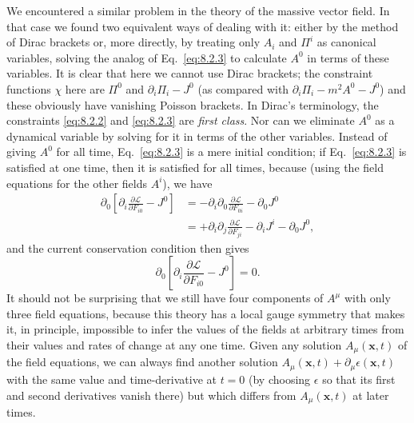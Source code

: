 We encountered a similar problem in the theory of the massive vector
field. In that case we found two equivalent ways of dealing with it:
either by the method of Dirac brackets or, more directly, by treating only
$A_i$ and $\Pi^i$ as canonical variables, solving the analog of Eq.~\eqref{eq:8.2.3} to
calculate $A^0$ in terms of these variables. It is clear that here we cannot
use Dirac brackets; the constraint functions $\chi$ here are $\Pi^0$ and
$\partial_i\Pi_i-J^0$ (as compared with $\partial_i\Pi_i-m^2A^0-J^0$) and these
obviously have vanishing Poisson brackets. In Dirac's terminology, the
constraints \eqref{eq:8.2.2} and \eqref{eq:8.2.3} are \textit{first class}. Nor can we eliminate
$A^0$ as a dynamical variable by solving for it in terms of the other variables.
Instead of giving $A^0$ for all time, Eq.~\eqref{eq:8.2.3} is a mere initial condition;
if Eq.~\eqref{eq:8.2.3} is satisfied at one time, then it is satisfied for all times,
because (using the field equations for the other fields $A^i$), we have
\begin{align*}
  \partial_0\left[\partial_i\frac{\partial\mathcal L}{\partial F_{i0}}-J^0\right]
  &=-\partial_i\partial_0\frac{\partial\mathcal L}{\partial F_{0i}}
  -\partial_0J^0\\
  &=+\partial_i\partial_j\frac{\partial\mathcal L}{\partial F_{ji}}
  -\partial_iJ^i-\partial_0J^0,
\end{align*}
and the current conservation condition then gives
\begin{equation}
  \partial_0\left[\partial_i\frac{\partial\mathcal L}{\partial F_{i0}}-J^0\right]=0.
  \tag{8.2.5}\label{eq:8.2.5}
\end{equation}
It should not be surprising that we still have four components of $A^\mu$
with only three field equations, because this theory has a local gauge
symmetry that makes it, in principle, impossible to infer the values of the
fields at arbitrary times from their values and rates of change at any one
time. Given any solution $A_\mu(\mathbf x,t)$ of the field equations, we can
always find another solution $A_\mu(\mathbf x,t)+\partial_\mu\epsilon(\mathbf x,t)$
with the same value and time-derivative at $t=0$ (by choosing $\epsilon$ so that
its first and second derivatives vanish there) but which differs from
$A_\mu(\mathbf x,t)$ at later times.

